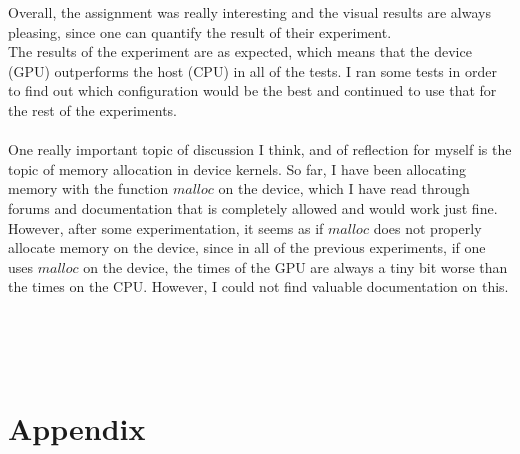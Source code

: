 \documentclass[english]{exam}
\begin{document}
Overall, the assignment was really interesting and the visual results are always pleasing, since one can quantify the result of their experiment.\\
The results of the experiment are as expected, which means that the device (GPU) outperforms the host (CPU) in all of the tests. I ran some tests in order to find out which configuration would be the best and continued to use that for the rest of the experiments.
\\\\
One really important topic of discussion I think, and of reflection for myself is the topic of memory allocation in device kernels. So far, I have been allocating memory with the function $malloc$ on the device, which I have read through forums and documentation that is completely allowed and would work just fine. However, after some experimentation, it seems as if $malloc$ does not properly allocate memory on the device, since in all of the previous experiments, if one uses $malloc$ on the device, the times of the GPU are always a tiny bit worse than the times on the CPU. However, I could not find valuable documentation on this.

\clearpage



\renewcommand{\bibname}{References}


\ \\ \ \\ \ \\

\section*{Appendix}
\end{document}
